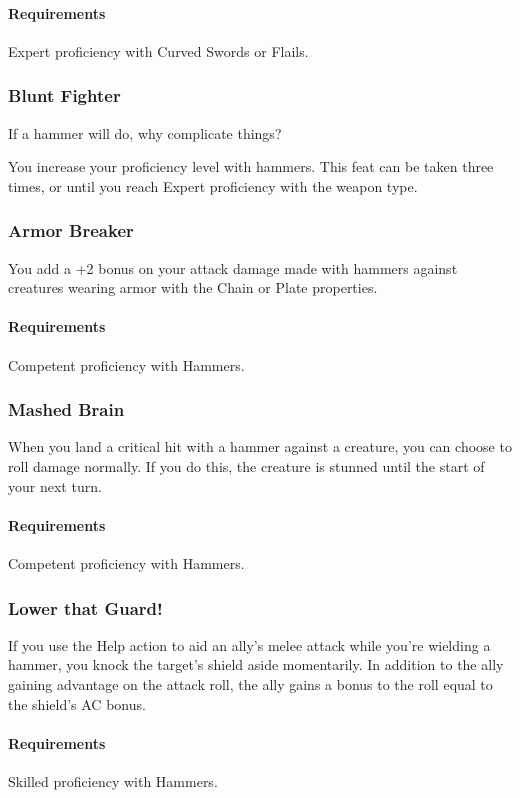     \paragraph{Requirements} Expert proficiency with Curved Swords or Flails.
\subsubsection{Blunt Fighter} \label{feat::bluntfighter}
    If a hammer will do, why complicate things?

    You increase your proficiency level with hammers.
    This feat can be taken three times, or until you reach Expert proficiency with the weapon type.
\subsubsection{Armor Breaker} \label{feat::armorbreaker}
    You add a +2 bonus on your attack damage made with hammers against creatures wearing armor with the Chain or Plate properties.
    \paragraph{Requirements} Competent proficiency with Hammers.
\subsubsection{Mashed Brain} \label{feat::mashedbrain}
    When you land a critical hit with a hammer against a creature, you can choose to roll damage normally.
    If you do this, the creature is stunned until the start of your next turn.
    \paragraph{Requirements} Competent proficiency with Hammers.
\subsubsection{Lower that Guard!} \label{feat::lowerthatguard}
    If you use the Help action to aid an ally's melee attack while you're wielding a hammer, you knock the target's shield aside momentarily.
    In addition to the ally gaining advantage on the attack roll, the ally gains a bonus to the roll equal to the shield's AC bonus.
    \paragraph{Requirements} Skilled proficiency with Hammers.
